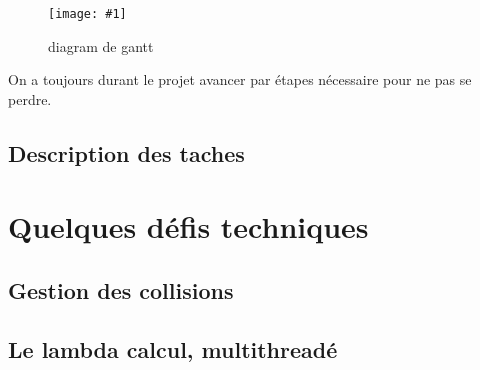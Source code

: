 \documentclass[french,12pt]{article}
\newcommand{\monimage}[4]{
\par\noindent
\begin{figure}[htp] %
\begin{center}
\texttt{[image: \#1]} %
\caption{#2} %
\label{#3} %
\end{center}
\end{figure} %
}
\begin{document}
\monimage{gantt.png}{diagram de gantt}{dg}{1}

On a toujours durant le projet avancer par étapes nécessaire pour ne pas se perdre.



\subsection{Description des taches}



\section{Quelques défis techniques}


\subsection{Gestion des collisions}


\subsection{Le lambda calcul, multithreadé}


\newpage
\listoffigures
\newpage
\end{document}
